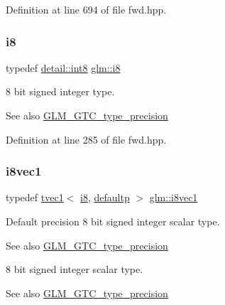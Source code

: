 Definition at line 694 of file fwd.\+hpp.

\mbox{\label{group__gtc__type__precision_gaae064be68b7d36cd7910c16e8ad18bba}} 
\subsubsection{\texorpdfstring{i8}{i8}}
{\footnotesize\ttfamily typedef \mbox{\hyperlink{namespaceglm_1_1detail_a04b526a8d7a9b455602a0afa78c531e0}{detail\+::int8}} \mbox{\hyperlink{group__gtc__type__precision_gaae064be68b7d36cd7910c16e8ad18bba}{glm\+::i8}}}

8 bit signed integer type. \begin{DoxySeeAlso}{See also}
\mbox{\hyperlink{group__gtc__type__precision}{G\+L\+M\+\_\+\+G\+T\+C\+\_\+type\+\_\+precision}} 
\end{DoxySeeAlso}


Definition at line 285 of file fwd.\+hpp.

\mbox{\label{group__gtc__type__precision_ga1cb1ef0f2a9266aba88f161c9062cebc}} 
\subsubsection{\texorpdfstring{i8vec1}{i8vec1}}
{\footnotesize\ttfamily typedef \mbox{\hyperlink{structglm_1_1tvec1}{tvec1}}$<$ \mbox{\hyperlink{group__gtc__type__precision_gaae064be68b7d36cd7910c16e8ad18bba}{i8}}, \mbox{\hyperlink{namespaceglm_a0f04f086094c747d227af4425893f545a9d21ccd8b5a009ec7eb7677befc3bf51}{defaultp}} $>$ \mbox{\hyperlink{group__gtc__type__precision_ga1cb1ef0f2a9266aba88f161c9062cebc}{glm\+::i8vec1}}}

Default precision 8 bit signed integer scalar type. \begin{DoxySeeAlso}{See also}
\mbox{\hyperlink{group__gtc__type__precision}{G\+L\+M\+\_\+\+G\+T\+C\+\_\+type\+\_\+precision}}
\end{DoxySeeAlso}
8 bit signed integer scalar type. \begin{DoxySeeAlso}{See also}
\mbox{\hyperlink{group__gtc__type__precision}{G\+L\+M\+\_\+\+G\+T\+C\+\_\+type\+\_\+precision}} 
\end{DoxySeeAlso}


